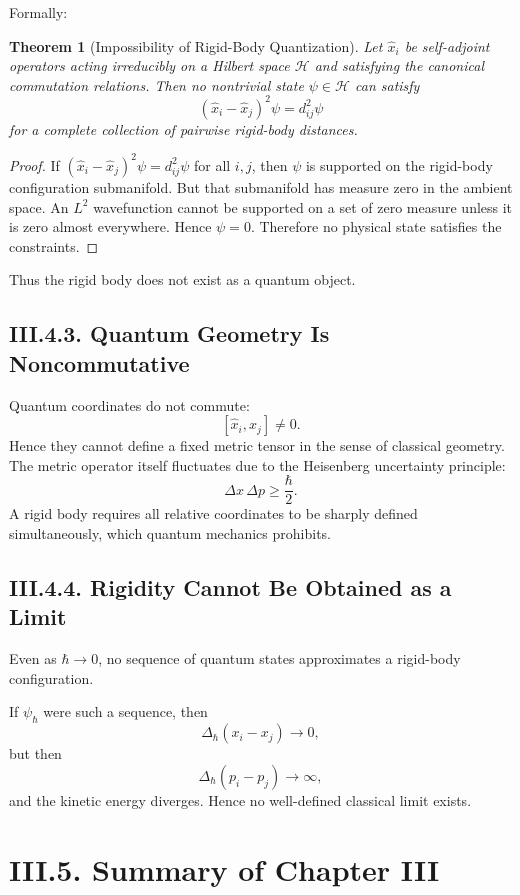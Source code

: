 \documentclass[12pt,oneside]{book}
\theoremstyle{plain}
\newtheorem{theorem}{Theorem}[chapter]
\theoremstyle{definition}
\begin{document}
Formally:

\begin{theorem}[Impossibility of Rigid-Body Quantization]
Let $\widehat{x}_i$ be self-adjoint operators acting irreducibly on a Hilbert
space $\mathcal{H}$ and satisfying the canonical commutation relations. Then
no nontrivial state $\psi\in\mathcal{H}$ can satisfy
\[
(\widehat{x}_i - \widehat{x}_j)^2\psi=d_{ij}^2\psi
\]
for a complete collection of pairwise rigid-body distances.
\end{theorem}

\begin{proof}
If $(\widehat{x}_i - \widehat{x}_j)^2\psi=d_{ij}^2\psi$ for all $i,j$, then
$\psi$ is supported on the rigid-body configuration submanifold. But that
submanifold has measure zero in the ambient space. An $L^2$ wavefunction
cannot be supported on a set of zero measure unless it is zero almost
everywhere. Hence $\psi=0$. Therefore no physical state satisfies the
constraints.
\end{proof}

Thus the rigid body does not exist as a quantum object.

\subsection*{III.4.3. Quantum Geometry Is Noncommutative}

Quantum coordinates do not commute:
\[
[\widehat{x}_i,\widehat{x}_j]\neq 0.
\]
Hence they cannot define a fixed metric tensor in the sense of classical
geometry. The metric operator itself fluctuates due to the Heisenberg
uncertainty principle:
\[
\Delta x\,\Delta p \ge \frac{\hbar}{2}.
\]
A rigid body requires all relative coordinates to be sharply defined
simultaneously, which quantum mechanics prohibits.

\subsection*{III.4.4. Rigidity Cannot Be Obtained as a Limit}

Even as $\hbar\to 0$, no sequence of quantum states approximates a rigid-body
configuration.

If $\psi_\hbar$ were such a sequence, then
\[
\Delta_\hbar(x_i - x_j) \to 0,
\]
but then
\[
\Delta_\hbar(p_i - p_j) \to \infty,
\]
and the kinetic energy diverges. Hence no well-defined classical limit exists.

\section{III.5. Summary of Chapter III}
\end{document}
